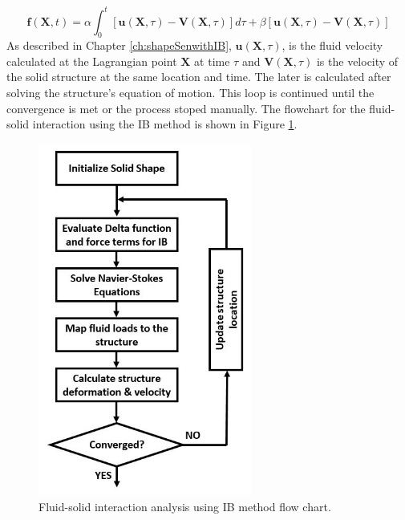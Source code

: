 %
\begin{equation}\label{eq:C5_immersedBoundaryForceTerm}
    \mathbf{f}(\mathbf{X}, t) = 
    \alpha \int_0^t \left[ \mathbf{u}(\mathbf{X}, \tau) - \mathbf{V}(\mathbf{X}, \tau) \right] d\tau + 
    \beta \left[ \mathbf{u}(\mathbf{X}, \tau) - \mathbf{V}(\mathbf{X}, \tau) \right]
\end{equation}
%
As described in Chapter \ref{ch:shapeSenwithIB}, $\mathbf{u}(\mathbf{X}, \tau)$, is the fluid velocity calculated at the Lagrangian point $\mathbf{X}$ at time $\tau$ and $\mathbf{V}(\mathbf{X}, \tau)$ is the velocity of the solid structure at the same location and time. The later is calculated after solving the structure's equation of motion. This loop is continued until the convergence is met or the process stoped manually. The flowchart for the fluid-solid interaction using the IB method is shown in Figure \ref{fig:C5_FSIflowchart}.
%
\begin{figure}[H]
    \centering
    \includegraphics[width=7.00cm]{Chapter_5/figure/Chapter5_FSI_FlowChart.jpg}
    \caption{Fluid-solid interaction analysis using IB method flow chart.}
    \label{fig:C5_FSIflowchart}
\end{figure}
%